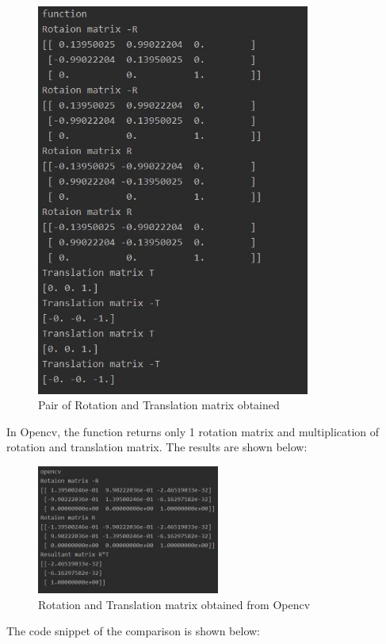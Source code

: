 \documentclass[12pt]{article}
\begin{document}
\begin{figure}[h]
    \centering
    \includegraphics[width=9cm]{came}
    \caption{Pair of Rotation and Translation matrix obtained}
    \label{fig:Pair of Rotation and Translation matrix obtained}
\end{figure}
\newline
In Opencv, the function returns only 1 rotation matrix and multiplication of rotation and translation matrix. The results are shown below:
\newpage
\begin{figure}[h]
    \centering
    \includegraphics[width=6cm]{came1}
    \caption{Rotation and Translation matrix obtained from Opencv}
    \label{fig:Rotation and Translation matrix obtained from Opencv}
\end{figure}
The code snippet of the comparison is shown below:
\end{document}
